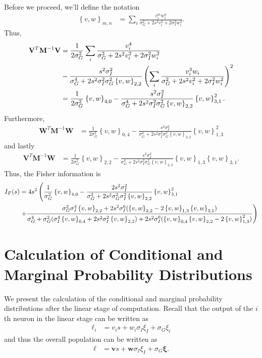 \documentclass[11pt]{article}
\begin{document}
	Before we proceed, we'll define the notation 
	\begin{align}
	\left\{v, w\right\}_{m,n} &= \sum_i \frac{v_i^m w_i^n}{\sigma_G^2 + 2s^2 v_i^2 + 2\sigma_I^2 w_i^2}.
	\end{align}
	Thus,
	\begin{align}
	\mathbf{V}^T \mathbf{M}^{-1}\mathbf{V} &= \frac{1}{2\sigma_G^2}\sum_i \frac{v_i^4}{\sigma_G^2 + 2s^2 v_i^2  +2\sigma_I^2 w_i^2} \notag \\
	&- \frac{s^2\sigma_I^2}{\sigma_G^4 + 2s^2 \sigma_I^2 \sigma_G^2 \left\{v,w\right\}_{2,2}} \left(\sum_i\frac{v_i^3 w_i}{\sigma_G^2 + 2s^2 v_i^2 + 2 \sigma_I^2 w_i^2}\right)^2 \\
	&= \frac{1}{2\sigma_G^2}\left\{v,w\right\}_{4,0} - \frac{s^2 \sigma_I^2}{\sigma_G^4 + 2s^2 \sigma_I^2 \sigma_G^2 \left\{v,w\right\}_{2,2}} \left\{v,w\right\}_{3,1}^2.
	\end{align}
	Furthermore,
	\begin{align}
	\mathbf{W}^T \mathbf{M}^{-1}\mathbf{W}  &= \frac{1}{2\sigma_G^2}\left\{v,w\right\}_{0,4} - \frac{s^2\sigma_I^2}{\sigma_G^4 + 2s^2 \sigma_I^2 \sigma_G^2 \left\{v,w\right\}_{2,2}} \left\{v,w\right\}_{1,3}^2
	\end{align}
	and lastly
	\begin{align}
	\mathbf{V}^T \mathbf{M}^{-1} \mathbf{W} &= \frac{1}{2\sigma_G^2}\left\{v,w\right\}_{2,2} - \frac{s^2\sigma_I^2}{\sigma_G^4 + 2s^2\sigma_I^2 \sigma_G^2\left\{v,w\right\}_{2,2}} \left\{v,w\right\}_{1,3}\left\{v,w\right\}_{3,1}.
	\end{align}
	Thus, the Fisher information is 
	\begin{align}
	I_F(s) &= 4s^2 \left(\frac{1}{\sigma_G^2}\left\{v, w\right\}_{4,0} - \frac{2s^2 \sigma_I^2}{\sigma_G^2 + 2s^2 \sigma_G^2 \sigma_I^2 \left\{v,w\right\}_{2,2}} \left\{v,w\right\}_{3,1}^2  \right. \notag \\
	&\left. + \frac{\sigma_G^2 \sigma_I^4 \left\{v,w\right\}_{2,2} + 2s^2 \sigma_I^6 (\left\{v,w\right\}_{2,2} - 2 \left\{v,w\right\}_{1,3} \left\{v,w\right\}_{3,1})}{\sigma_G^4  + \sigma_G^2 (\sigma_I^4 \left\{v,w\right\}_{0,4} + 2s^2 \sigma_I^2 \left\{v,w\right\}_{2,2}) + 2s^2 \sigma_I^6 (\left\{v,w\right\}_{0,4} \left\{v,w\right\}_{2,2} - 2 \left\{v,w\right\}_{1,3}^2)}\right)
	\end{align}
	\newpage
	\section{Calculation of Conditional and Marginal Probability Distributions}
	We present the calculation of the conditional and marginal probability distributions after the linear stage of computation. Recall that the output of the $i$th neuron in the linear stage can be written as
	\begin{align}
		\ell_i &= v_i s + w_i \sigma_I \xi_I + \sigma_G\xi_i
	\end{align}
	and thus the overall population can be written as 
	\begin{align}
		\boldsymbol{\ell} &= \mathbf{v} s + \mathbf{w} \sigma_I \xi_I + \sigma_G \boldsymbol{\xi}.
	\end{align}
	
\end{document}
